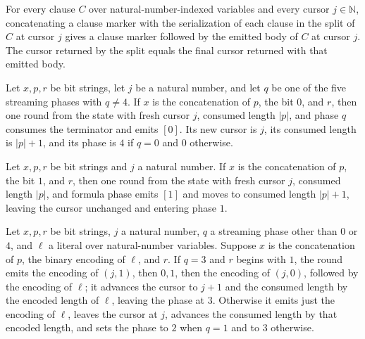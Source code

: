 \begin{lemma}
\label{Complexity.satStreamClause_split}
\leanok
{}
For every clause $C$ over natural-number-indexed variables and every cursor
$j\in\mathbb{N}$, concatenating a clause marker with the serialization of each clause in
the split of $C$ at cursor $j$ gives a clause marker followed by the emitted body of $C$
at cursor $j$. The cursor returned by the split equals the final cursor returned with
that emitted body.
\end{lemma}

\begin{lemma}
\label{Complexity.satStreamRound_false}
\leanok
{}
Let $x,p,r$ be bit strings, let $j$ be a natural number, and let $q$ be one of the five
streaming phases with $q \ne 4$. If $x$ is the concatenation of $p$, the bit $0$, and
$r$, then one round from the state with fresh cursor $j$, consumed length $|p|$, and
phase $q$ consumes the terminator and emits $[0]$. Its new cursor is $j$, its consumed
length is $|p|+1$, and its phase is $4$ if $q=0$ and $0$ otherwise.
\end{lemma}

\begin{lemma}
\label{Complexity.satStreamRound_marker}
\leanok
{}
Let $x,p,r$ be bit strings and $j$ a natural number. If $x$ is the concatenation of $p$,
the bit $1$, and $r$, then one round from the state with fresh cursor $j$, consumed
length $|p|$, and formula phase emits $[1]$ and moves to consumed length $|p|+1$,
leaving the cursor unchanged and entering phase $1$.
\end{lemma}

\begin{lemma}
\label{Complexity.satStreamRound_literal}
\leanok
{}
Let $x,p,r$ be bit strings, $j$ a natural number, $q$ a streaming phase other than $0$
or $4$, and $\ell$ a literal over natural-number variables. Suppose $x$ is the
concatenation of $p$, the binary encoding of $\ell$, and $r$. If $q=3$ and $r$ begins
with $1$, the round emits the encoding of $(j,1)$, then $0,1$, then the encoding of
$(j,0)$, followed by the encoding of $\ell$; it advances the cursor to $j+1$ and the
consumed length by the encoded length of $\ell$, leaving the phase at $3$. Otherwise it
emits just the encoding of $\ell$, leaves the cursor at $j$, advances the consumed
length by that encoded length, and sets the phase to $2$ when $q=1$ and to $3$
otherwise.
\end{lemma}

